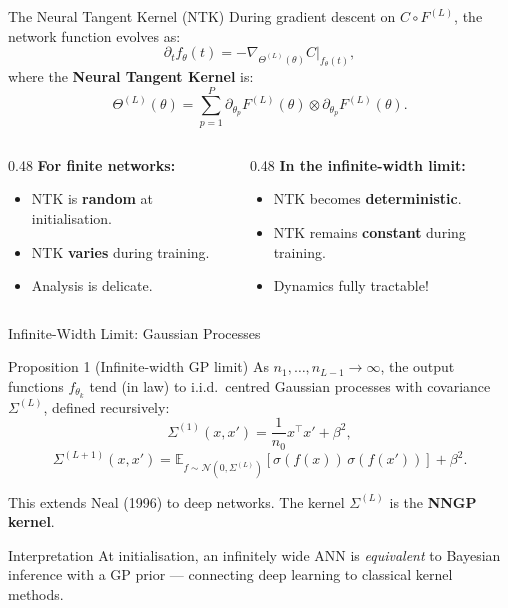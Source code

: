 \documentclass[aspectratio=169, 10pt]{beamer}
\newcommand{\E}{\mathbb{E}}
\newcommand{\fth}{f_\theta}
\newcommand{\highlight}[1]{\textcolor{blue!70!black}{\textbf{#1}}}
\newcommand{\myalert}[1]{\textcolor{red!70!black}{\textbf{#1}}}
\begin{document}
\begin{frame}{The Neural Tangent Kernel (NTK)}
  During gradient descent on $C\circ F^{(L)}$, the network function evolves as:
  \[
    \partial_t \fth(t) = -\nabla_{\Theta^{(L)}(\theta)} C\big|_{\fth(t)},
  \]
  where the \textbf{Neural Tangent Kernel} is:
  \[
    \boxed{
      \Theta^{(L)}(\theta) = \sum_{p=1}^P \partial_{\theta_p} F^{(L)}(\theta) \otimes \partial_{\theta_p} F^{(L)}(\theta).
    }
  \]

  \begin{columns}[T]
    \begin{column}{0.48\textwidth}
      \textbf{For finite networks:}
      \begin{itemize}
        \item NTK is \myalert{random} at initialisation.
        \item NTK \myalert{varies} during training.
        \item Analysis is delicate.
      \end{itemize}
    \end{column}
    \begin{column}{0.48\textwidth}
      \textbf{In the infinite-width limit:}
      \begin{itemize}
        \item NTK becomes \highlight{deterministic}.
        \item NTK remains \highlight{constant} during training.
        \item Dynamics fully tractable!
      \end{itemize}
    \end{column}
  \end{columns}
\end{frame}

\begin{frame}{Infinite-Width Limit: Gaussian Processes}
  \begin{block}{Proposition 1 (Infinite-width GP limit)}
    As $n_1,\ldots,n_{L-1}\to\infty$, the output functions $\fth_k$ tend (in law) to i.i.d.\ centred Gaussian processes with covariance $\Sigma^{(L)}$, defined recursively:
    \[
      \Sigma^{(1)}(x,x') = \frac{1}{n_0}x^\top x' + \beta^2,
    \]
    \[
      \Sigma^{(L+1)}(x,x') = \E_{f\sim\mathcal{N}(0,\Sigma^{(L)})}\!\left[\sigma(f(x))\,\sigma(f(x'))\right] + \beta^2.
    \]
  \end{block}

  \vspace{0.3em}
  This extends Neal (1996) to deep networks. The kernel $\Sigma^{(L)}$ is the \textbf{NNGP kernel}.

  \vspace{0.5em}
  \begin{exampleblock}{Interpretation}
    At initialisation, an infinitely wide ANN is \emph{equivalent} to Bayesian inference with a GP prior — connecting deep learning to classical kernel methods.
  \end{exampleblock}
\end{frame}
\end{document}
